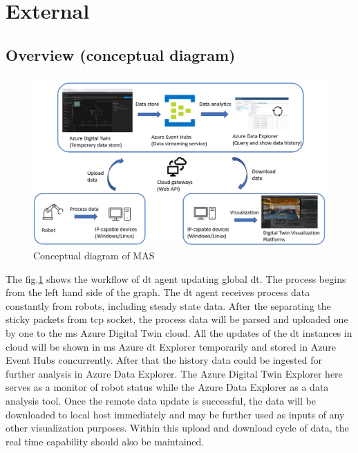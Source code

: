\section{External} \label{chap: Meth-External}


\subsection{Overview (conceptual diagram)}

\begin{figure}[htb]
\includegraphics[width=\textwidth]{figures/DT_Conceptual_Diagram.png}

\centering
\caption{Conceptual diagram of MAS\label{fig: DTConceptual}}
\end{figure}

The fig.\ref{fig: DTConceptual} shows the workflow of \gls{dt} agent updating global \gls{dt}.
The process begins from the left hand side of the graph. The \gls{dt} agent receives process data constantly from robots, including steady state data. 
After the separating the sticky packets from \gls{tcp} socket, the process data will be parsed and uploaded one by one to the \gls{ms} Azure Digital Twin cloud. 
All the updates of the \gls{dt} instances in cloud will be shown in \gls{ms} Azure \gls{dt} Explorer temporarily and stored in Azure Event Hubs concurrently. 
After that the history data could be ingested for further analysis in Azure Data Explorer. 
The Azure Digital Twin Explorer here serves as a monitor of robot status while the Azure Data Explorer as a data analysis tool. 
Once the remote data update is successful, the data will be downloaded to local host immediately and may be further used as inputs of any other visualization purposes. 
Within this upload and download cycle of data, the real time capability should also be maintained.  


